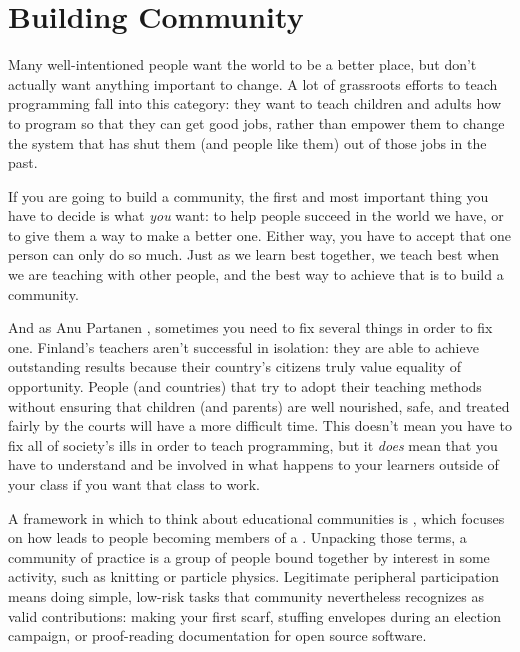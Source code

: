 \chapter{Building Community}\label{s:community}

Many well-intentioned people want the world to be a better place, but
don't actually want anything important to change. A lot of grassroots
efforts to teach programming fall into this category: they want to teach
children and adults how to program so that they can get good jobs,
rather than empower them to change the system that has shut them (and
people like them) out of those jobs in the past.

If you are going to build a community, the first and most important
thing you have to decide is what \emph{you} want: to help people succeed in
the world we have, or to give them a way to make a better one. Either
way, you have to accept that one person can only do so much. Just as we
learn best together, we teach best when we are teaching with other
people, and the best way to achieve that is to build a community.

And as Anu Partanen , sometimes
you need to fix several things in order to fix one. Finland's teachers
aren't successful in isolation: they are able to achieve outstanding
results because their country's citizens truly value equality of
opportunity. People (and countries) that try to adopt their teaching
methods without ensuring that children (and parents) are well
nourished, safe, and treated fairly by the courts will have a more
difficult time. This doesn't mean you have to fix all of society's
ills in order to teach programming, but it \emph{does} mean that you have
to understand and be involved in what happens to your learners outside
of your class if you want that class to work.

A framework in which to think about educational communities is
, which focuses on how
 leads to people
becoming members of a  \cite{Weng2015}. Unpacking
those terms, a community of practice is a group of people bound
together by interest in some activity, such as knitting or particle
physics. Legitimate peripheral participation means doing simple,
low-risk tasks that community nevertheless recognizes as valid
contributions: making your first scarf, stuffing envelopes during an
election campaign, or proof-reading documentation for open source
software.

